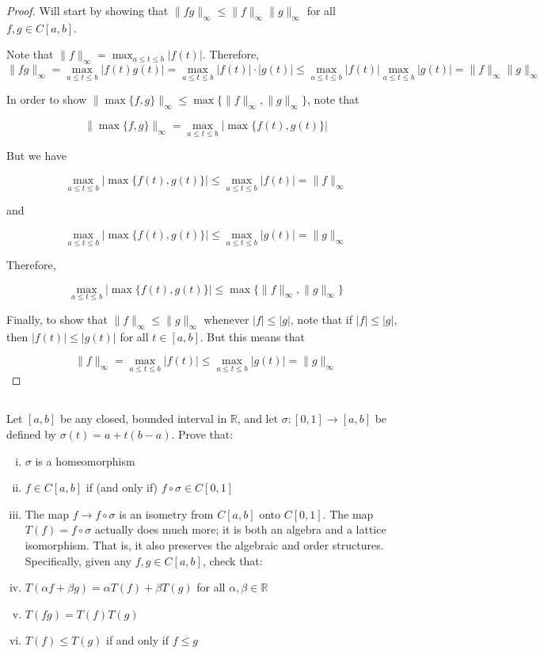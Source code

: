 \begin{proof}
Will start by showing that $\|fg\|_\infty \leq \|f\|_\infty \|g\|_\infty$ for all $f,g \in C[a,b]$.

Note that $\|f\|_\infty = \max_{a\leq t \leq b} |f(t)|$. Therefore, 
$$\|fg\|_\infty = \max_{a\leq t \leq b} |f(t)g(t)| = \max_{a\leq t \leq b} |f(t)| \cdot |g(t)| \leq \max_{a\leq t \leq b} |f(t)| \max_{a\leq t \leq b} |g(t)| = \|f\|_\infty \|g\|_\infty $$

\vspace{1em}
In order to show $\| \max\{f, g\} \|_\infty \leq \max \{ \| f \|_\infty, \| g \|_\infty \}$, note that


$$\| \max\{f, g\} \|_\infty = \max_{a\leq t \leq b} | \max\{f(t), g(t)\} | $$

But we have

$$ \max_{a\leq t \leq b} | \max\{f(t), g(t)\} | \leq \max_{a\leq t \leq b} | f(t) | = \|f\|_\infty$$

and

$$ \max_{a\leq t \leq b} | \max\{f(t), g(t)\} | \leq \max_{a\leq t \leq b} | g(t) | = \|g\|_\infty $$

Therefore, 

$$ \max_{a\leq t \leq b} | \max\{f(t), g(t)\} | \leq \max\{\|f\|_\infty, \|g\|_\infty\}$$

\vspace{1em}

Finally, to show that $\| f \|_\infty \leq \| g \|_\infty$ whenever $ |f| \leq  |g|$, note that if $|f| \leq |g|$, then $|f(t)| \leq |g(t)|$ for all $t \in [a,b]$. But this means that 

$$ \|f\|_\infty = \max_{a\leq t \leq b} |f(t)| \leq \max_{a\leq t \leq b} |g(t)| = \|g\|_\infty$$

\end{proof}

\subsection{} Let $[ a, b ]$ be any closed, bounded interval in $\mathbb{R}$, and let $\sigma: [ 0, 1 ] \rightarrow [ a, b ]$ be defined by $\sigma(t) = a + t(b-a)$. Prove that:

\begin{enumerate}[i)]
    \item $\sigma$ is a homeomorphism
    \item $f \in C [ a, b ]$ if (and only if) $f \circ \sigma \in C[0,1]$
    \item The map $f \rightarrow f \circ \sigma$ is an isometry from $C[a,b]$ onto $C[0,1]$. The map $T(f) = f \circ \sigma$ actually does  much  more; it is both an algebra and a lattice isomorphism. That is,  it  also preserves the algebraic and order structures. 
    Specifically, given any $f, g \in C [ a, b ] $, check that:
    \item $T(\alpha f + \beta g) = \alpha T(f) + \beta T(g)$ for all $\alpha, \beta \in \mathbb{R}$
    \item $T(fg) = T(f) T(g)$
    \item $T(f) \leq T(g)$ if and only if $f\leq g$
\end{enumerate}

